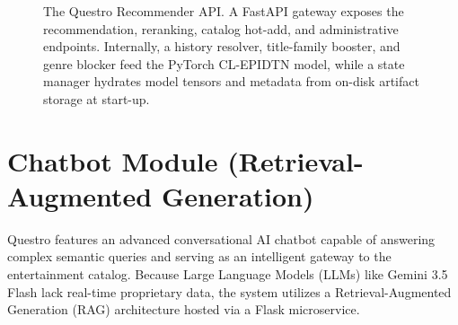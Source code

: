 \begin{figure}
{%
    }
    \caption{The Questro Recommender API. A FastAPI gateway exposes the recommendation, reranking, catalog hot-add, and administrative endpoints. Internally, a history resolver, title-family booster, and genre blocker feed the PyTorch CL-EPIDTN model, while a state manager hydrates model tensors and metadata from on-disk artifact storage at start-up.}
    \label{fig:questro_api_architecture}
\end{figure}

\section{Chatbot Module (Retrieval-Augmented Generation)}
Questro features an advanced conversational AI chatbot capable of answering complex semantic queries and serving as an intelligent gateway to the entertainment catalog. Because Large Language Models (LLMs) like Gemini 3.5 Flash \cite{gemini_ref} lack real-time proprietary data, the system utilizes a Retrieval-Augmented Generation (RAG) architecture hosted via a Flask microservice.

